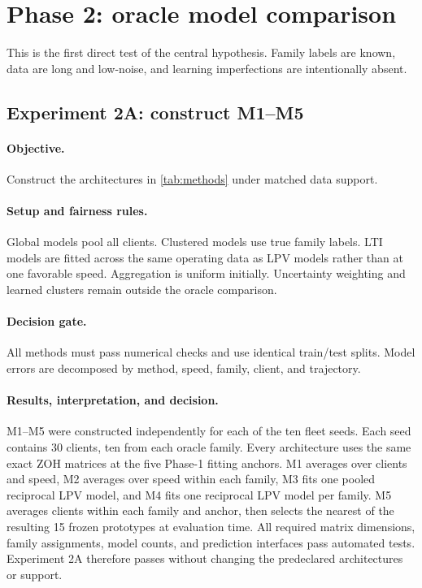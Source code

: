 \section{Phase 2: oracle model comparison}
\label{sec:phase2}
This is the first direct test of the central hypothesis. Family labels are known,
data are long and low-noise, and learning imperfections are intentionally absent.

\subsection{Experiment 2A: construct M1--M5}
\paragraph{Objective.}
Construct the architectures in \cref{tab:methods} under matched data support.

\paragraph{Setup and fairness rules.}
Global models pool all clients. Clustered models use true family labels. LTI
models are fitted across the same operating data as LPV models rather than at one
favorable speed. Aggregation is uniform initially. Uncertainty weighting and
learned clusters remain outside the oracle comparison.

\paragraph{Decision gate.}
All methods must pass numerical checks and use identical train/test splits. Model
errors are decomposed by method, speed, family, client, and trajectory.

\paragraph{Results, interpretation, and decision.}
M1--M5 were constructed independently for each of the ten fleet seeds.  Each
seed contains 30 clients, ten from each oracle family.  Every architecture uses
the same exact ZOH matrices at the five Phase-1 fitting anchors.  M1 averages
over clients and speed, M2 averages over speed within each family, M3 fits one
pooled reciprocal LPV model, and M4 fits one reciprocal LPV model per family.
M5 averages clients within each family and anchor, then selects the nearest of
the resulting 15 frozen prototypes at evaluation time.  All required matrix
dimensions, family assignments, model counts, and prediction interfaces pass
automated tests.  Experiment 2A therefore passes without changing the
predeclared architectures or support.

